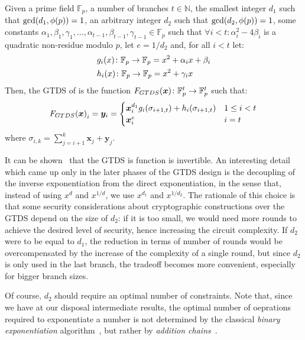 \begin{definition}\label{def:gtds}
  Given a prime field \(\mathbb{F}_p\), a number of branches \(t \in \mathbb{N}\), the smallest 
  integer \(d_1\) such that \(\call{\gcd}{d_1, \call{\totient}{p}} = 1\), an arbitrary 
  integer \(d_2\) such that \(\call{\gcd}{d_2, \call{\totient}{p}} = 1\), some constants 
  \(\alpha_{1}, \beta_{1}, \gamma_1, \dots, \alpha_{t - 1}, \beta_{t - 1}, \gamma_{t - 1} \in \mathbb{F}_p\) 
  such that \(\forall i < t\colon \alpha_i^2 - 4\beta_i\) is a quadratic non-residue modulo 
  \(p\), let \(e = {1}/{d_2}\) and, for all \(i < t\) let:
  \begin{align*}
    & \call{g_i}{x}\colon \mathbb{F}_p \to \mathbb{F}_p = x^2 + \alpha_{i}x + \beta_{i} \\
    & \call{h_i}{x}\colon \mathbb{F}_p \to \mathbb{F}_p = x^2 + \gamma_{i}x
  \end{align*}
  Then, the GTDS of \Arion{} is the function 
  \(\call{F_{GTDS}}{\bm{x}}\colon \mathbb{F}_p^t \to \mathbb{F}_p^t\) such that:
  \[
    \call{F_{GTDS}}{\bm{x}}_i = \bm{y}_i = 
    \begin{cases}
      \bm{x}_i^{d_1}\call{g_i}{\sigma_{i+1, t}} + \call{h_i}{\sigma_{i+1, t}} & 1 \le i < t \\
      \bm{x}_i^e & i = t
    \end{cases}
  \]
  where \(\sigma_{i, k} = \sum_{j=i+1}^{k}{\bm{x}_j + \bm{y}_j}\).
\end{definition}

It can be shown~\cite{RoyS2022} that the GTDS is function is invertible.
An interesting detail which came up only in the later phases of the GTDS design is the decoupling 
of the inverse exponentiation from the direct exponentiation, in the sense that, instead of 
using \(x^d\) and \(x^{1/d}\), we use \(x^{d_1}\) and \(x^{1/d_2}\).
The rationale of this choice is that some security considerations about cryptographic constructions
over the GTDS depend on the size of \(d_2\): if it is too small, we would need more rounds to 
achieve the desired level of security, hence increasing the circuit complexity.
If \(d_2\) were to be equal to \(d_1\), the reduction in terms of number of rounds would be 
overcompensated by the increase of the complexity of a single round, but since \(d_2\) is only 
used in the last branch, the tradeoff becomes more convenient, especially for bigger branch sizes.

Of course, \(d_2\) should require an optimal number of constraints.
Note that, since we have at our disposal intermediate results, the optimal number of oeprations 
required to exponentiate a number is not determined by the classical \emph{binary exponentiation} 
algorithm~\cite{Gueron2011}, but rather by \emph{addition chains}~\cite{BosC1990}.

